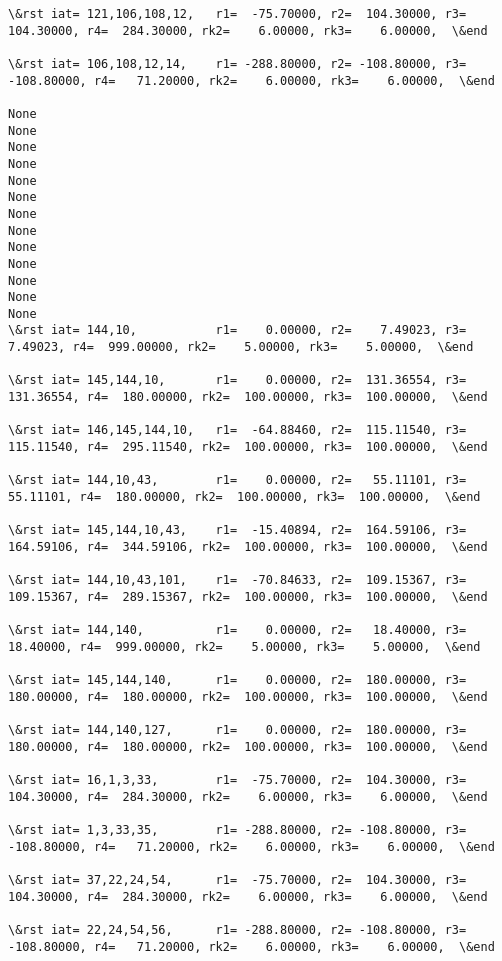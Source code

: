 \documentclass[11pt]{article}
\begin{document}
\begin{Verbatim}[commandchars=\\\{\}]
\&rst iat= 121,106,108,12,   r1=  -75.70000, r2=  104.30000, r3=  104.30000, r4=  284.30000, rk2=    6.00000, rk3=    6.00000,  \&end

\&rst iat= 106,108,12,14,    r1= -288.80000, r2= -108.80000, r3= -108.80000, r4=   71.20000, rk2=    6.00000, rk3=    6.00000,  \&end

None
None
None
None
None
None
None
None
None
None
None
None
None
\&rst iat= 144,10,           r1=    0.00000, r2=    7.49023, r3=    7.49023, r4=  999.00000, rk2=    5.00000, rk3=    5.00000,  \&end

\&rst iat= 145,144,10,       r1=    0.00000, r2=  131.36554, r3=  131.36554, r4=  180.00000, rk2=  100.00000, rk3=  100.00000,  \&end

\&rst iat= 146,145,144,10,   r1=  -64.88460, r2=  115.11540, r3=  115.11540, r4=  295.11540, rk2=  100.00000, rk3=  100.00000,  \&end

\&rst iat= 144,10,43,        r1=    0.00000, r2=   55.11101, r3=   55.11101, r4=  180.00000, rk2=  100.00000, rk3=  100.00000,  \&end

\&rst iat= 145,144,10,43,    r1=  -15.40894, r2=  164.59106, r3=  164.59106, r4=  344.59106, rk2=  100.00000, rk3=  100.00000,  \&end

\&rst iat= 144,10,43,101,    r1=  -70.84633, r2=  109.15367, r3=  109.15367, r4=  289.15367, rk2=  100.00000, rk3=  100.00000,  \&end

\&rst iat= 144,140,          r1=    0.00000, r2=   18.40000, r3=   18.40000, r4=  999.00000, rk2=    5.00000, rk3=    5.00000,  \&end

\&rst iat= 145,144,140,      r1=    0.00000, r2=  180.00000, r3=  180.00000, r4=  180.00000, rk2=  100.00000, rk3=  100.00000,  \&end

\&rst iat= 144,140,127,      r1=    0.00000, r2=  180.00000, r3=  180.00000, r4=  180.00000, rk2=  100.00000, rk3=  100.00000,  \&end

\&rst iat= 16,1,3,33,        r1=  -75.70000, r2=  104.30000, r3=  104.30000, r4=  284.30000, rk2=    6.00000, rk3=    6.00000,  \&end

\&rst iat= 1,3,33,35,        r1= -288.80000, r2= -108.80000, r3= -108.80000, r4=   71.20000, rk2=    6.00000, rk3=    6.00000,  \&end

\&rst iat= 37,22,24,54,      r1=  -75.70000, r2=  104.30000, r3=  104.30000, r4=  284.30000, rk2=    6.00000, rk3=    6.00000,  \&end

\&rst iat= 22,24,54,56,      r1= -288.80000, r2= -108.80000, r3= -108.80000, r4=   71.20000, rk2=    6.00000, rk3=    6.00000,  \&end


\end{Verbatim}
\end{document}
